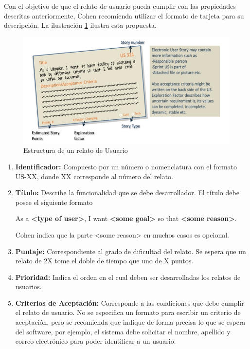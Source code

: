 Con el objetivo de que el relato de usuario pueda cumplir con las propiedades descritas anteriormente, Cohen recomienda utilizar el formato de tarjeta para su descripción. La ilustración \ref{fig:user_story_structure} ilustra esta propuesta.

\begin{figure}[ht]
  \begin{center}
  \includegraphics[width=1\textwidth]{./figures/chapter_02/12_yodiz_user_story_card.jpg}
  \caption{Estructura de un relato de Usuario}
  \label{fig:user_story_structure}
  \end{center}
\end{figure}

\begin{enumerate}
  \item \textbf{Identificador:} Compuesto por un número o nomenclatura con el formato US-XX, donde XX corresponde al número del relato.
  \item \textbf{Título:} Describe la funcionalidad que se debe desarrollador. El título debe posee el siguiente formato
    \begin{center}
      	As a \textbf{<type of user>}, I want \textbf{<some goal>} so that \textbf{<some reason>}.
    \end{center}

  Cohen \cite{user_stories_applied} indica que la parte <some reason> en muchos casos es opcional.
  \item \textbf{Puntaje:} Correspondiente al grado de dificultad del relato. Se espera que un relato de 2X tome el doble de tiempo que uno de X puntos.
  \item \textbf{Prioridad:} Indica el orden en el cual deben ser desarrolladas los relatos de usuarios.
  \item \textbf{Criterios de Aceptación:} Corresponde a las condiciones que debe cumplir el relato de usuario. No se especifica un formato para escribir un criterio de aceptación, pero se recomienda que indique de forma precisa lo que se espera del software, por ejemplo, el sistema debe solicitar el nombre, apellido y correo electrónico para poder identificar a un usuario.
\end{enumerate}

